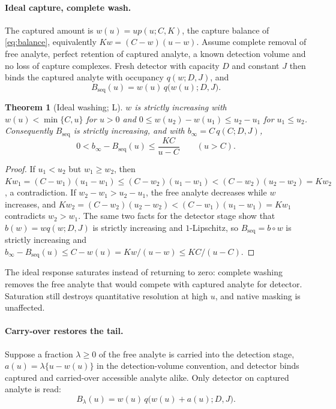 \documentclass[11pt]{article}
\theoremstyle{plain}
\newtheorem{theorem}{Theorem}[section]
\theoremstyle{definition}
\numberwithin{equation}{section}
\newcommand{\Bseq}{B_{\mathrm{seq}}}
\newcommand{\Lean}{\textsf{L}}   %
\begin{document}
\paragraph{Ideal capture, complete wash.} The captured amount is $w(u)=up(u;C,K)$,
the capture balance of \eqref{eq:balance}, equivalently $Kw=(C-w)(u-w)$. Assume
complete removal of free analyte, perfect retention of captured analyte, a known
detection volume and no loss of capture complexes. Fresh detector with capacity $D$
and constant $J$ then binds the captured analyte with occupancy $q(w;D,J)$, and
\begin{equation}\label{eq:seq}
 \Bseq(u)=w(u)\,q\bigl(w(u);D,J\bigr).
\end{equation}

\begin{theorem}[Ideal washing; \Lean]\label{thm:seq}
$w$ is strictly increasing with $w(u)<\min\{C,u\}$ for $u>0$ and
$0\le w(u_2)-w(u_1)\le u_2-u_1$ for $u_1\le u_2$. Consequently $\Bseq$ is strictly
increasing, and with $b_\infty=C\,q(C;D,J)$,
\begin{equation}\label{eq:plateau}
 0<b_\infty-\Bseq(u)\le\frac{KC}{u-C}\qquad(u>C).
\end{equation}
\end{theorem}
\begin{proof}
If $u_1<u_2$ but $w_1\ge w_2$, then
$Kw_1=(C-w_1)(u_1-w_1)\le(C-w_2)(u_1-w_1)<(C-w_2)(u_2-w_2)=Kw_2$, a contradiction.
If $w_2-w_1>u_2-u_1$, the free analyte decreases while $w$ increases, and
$Kw_2=(C-w_2)(u_2-w_2)<(C-w_1)(u_1-w_1)=Kw_1$ contradicts $w_2>w_1$. The same two
facts for the detector stage show that $b(w)=wq(w;D,J)$ is strictly increasing and
$1$-Lipschitz, so $\Bseq=b\circ w$ is strictly increasing and
$b_\infty-\Bseq(u)\le C-w(u)=Kw/(u-w)\le KC/(u-C)$.
\end{proof}
The ideal response saturates instead of returning to zero: complete washing removes
the free analyte that would compete with captured analyte for detector. Saturation
still destroys quantitative resolution at high $u$, and native masking is unaffected.

\paragraph{Carry-over restores the tail.} Suppose a fraction $\lambda\ge0$ of the
free analyte is carried into the detection stage, $a(u)=\lambda\{u-w(u)\}$ in the
detection-volume convention, and detector binds captured and carried-over
accessible analyte alike. Only detector on captured analyte is read:
\begin{equation}\label{eq:carry}
 B_\lambda(u)=w(u)\,q\bigl(w(u)+a(u);D,J\bigr).
\end{equation}
\end{document}

